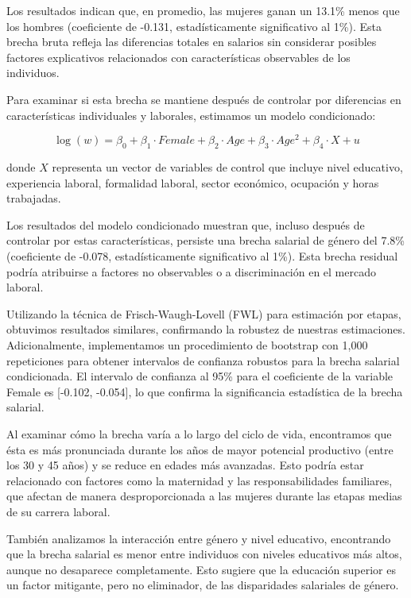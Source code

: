 \documentclass[12pt,a4paper,onecolumn]{article}
\begin{document}
Los resultados indican que, en promedio, las mujeres ganan un 13.1\% menos que los hombres (coeficiente de -0.131, estadísticamente significativo al 1\%). Esta brecha bruta refleja las diferencias totales en salarios sin considerar posibles factores explicativos relacionados con características observables de los individuos.

Para examinar si esta brecha se mantiene después de controlar por diferencias en características individuales y laborales, estimamos un modelo condicionado:

$$ \log(w) = \beta_0 + \beta_1 \cdot Female + \beta_2 \cdot Age + \beta_3 \cdot Age^2 + \beta_4 \cdot X + u $$

donde $X$ representa un vector de variables de control que incluye nivel educativo, experiencia laboral, formalidad laboral, sector económico, ocupación y horas trabajadas.

Los resultados del modelo condicionado muestran que, incluso después de controlar por estas características, persiste una brecha salarial de género del 7.8\% (coeficiente de -0.078, estadísticamente significativo al 1\%). Esta brecha residual podría atribuirse a factores no observables o a discriminación en el mercado laboral.

Utilizando la técnica de Frisch-Waugh-Lovell (FWL) para estimación por etapas, obtuvimos resultados similares, confirmando la robustez de nuestras estimaciones. Adicionalmente, implementamos un procedimiento de bootstrap con 1,000 repeticiones para obtener intervalos de confianza robustos para la brecha salarial condicionada. El intervalo de confianza al 95\% para el coeficiente de la variable Female es [-0.102, -0.054], lo que confirma la significancia estadística de la brecha salarial.

Al examinar cómo la brecha varía a lo largo del ciclo de vida, encontramos que ésta es más pronunciada durante los años de mayor potencial productivo (entre los 30 y 45 años) y se reduce en edades más avanzadas. Esto podría estar relacionado con factores como la maternidad y las responsabilidades familiares, que afectan de manera desproporcionada a las mujeres durante las etapas medias de su carrera laboral.

También analizamos la interacción entre género y nivel educativo, encontrando que la brecha salarial es menor entre individuos con niveles educativos más altos, aunque no desaparece completamente. Esto sugiere que la educación superior es un factor mitigante, pero no eliminador, de las disparidades salariales de género.
\end{document}
